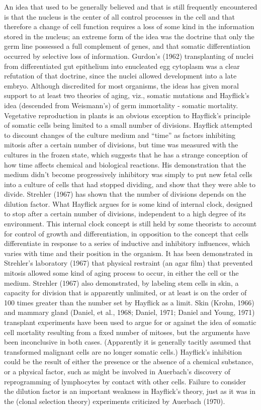 An idea that used to be generally believed and that is still frequently encountered is that the nucleus is the center of all control processes
in the cell and that therefore a change of cell function requires a loss of some kind in the information stored in the nucleus; an extreme form
of the idea was the doctrine that only the germ line possessed a full complement of genes, and that somatic differentiation occurred by selective loss 
of information. Gurdon's (1962) transplanting of nuclei from differentiated gut epithelium into enucleated egg cytoplasm was a clear refutation of that doctrine, since
the nuclei allowed development into a late embryo. Although discredited for most organisms, the ideas has given moral support to at least two
theories of aging, viz., somatic mutations and Hayflick's idea (descended from Weismann's) of germ immortality - somatic mortality. Vegetative reproduction
in plants is an obvious exception to Hayflick's principle of somatic cells being limited to a small number of divisions. Hayflick attempted to discount changes
of the culture medium and ``time'' as factors inhibiting mitosis after a certain number of divisions, but time was measured with the cultures in the frozen state, which
suggests that he has a strange conception of how time affects chemical and biological reactions. His demonstration that the medium didn't become progressively inhibitory
was simply to put new fetal cells into a culture of cells that had stopped dividing, and show that they were able to divide. Strehler (1967) has shown
that the number of divisions depends on the dilution factor. What Hayflick argues for is some kind of internal clock, designed to stop after a certain number
of divisions, independent to a high degree of its environment. This internal clock concept is still held by some theorists to account for control of growth and differentiation, in
opposition to the concept that cells differentiate in response to a series of inductive and inhibitory influences, which varies with time and their position in the
organism. It has been demonstrated in Strehler's laboratory (1967) that physical restraint (an agar film) that prevented mitosis allowed some kind of aging process to occur, in
either the cell or the medium. Strehler (1967) also demonstrated, by labeling stem cells in skin, a capacity for division that is apparently unlimited, or at least is on the
order of 100 times greater than the number set by Hayflick as a limit. Skin (Krohn, 1966) and mammary gland (Daniel, et al., 1968; Daniel, 1971; Daniel and Young, 1971) transplant
experiments have been used to argue for or against the idea of somatic cell mortality resulting from a fixed number of mitoses, but the arguments have been inconclusive in both cases. (Apparently
it is generally tacitly assumed that transformed malignant cells are no longer somatic cells.) Hayflick's inhibition could be the result of either the presence or the absence of a
chemical substance, or a physical factor, such as might be involved in Auerbach's discovery of reprogramming of lymphocytes by contact with other cells. Failure to
consider the dilution factor is an important weakness in Hayflick's theory, just as it was in the (clonal selection theory) experiments criticized by Auerbach (1970).

